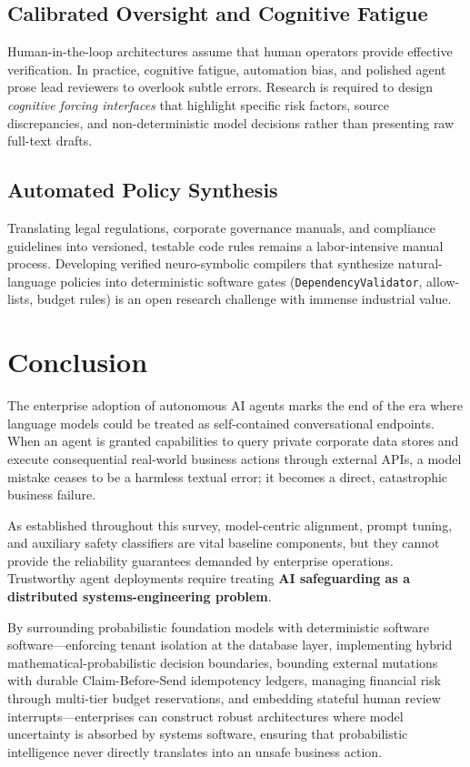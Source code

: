 \documentclass[10pt,a4paper,twocolumn]{article}
\begin{document}
\subsection{Calibrated Oversight and Cognitive Fatigue}
Human-in-the-loop architectures assume that human operators provide effective verification. In practice, cognitive fatigue, automation bias, and polished agent prose lead reviewers to overlook subtle errors. Research is required to design \emph{cognitive forcing interfaces} that highlight specific risk factors, source discrepancies, and non-deterministic model decisions rather than presenting raw full-text drafts.

\subsection{Automated Policy Synthesis}
Translating legal regulations, corporate governance manuals, and compliance guidelines into versioned, testable code rules remains a labor-intensive manual process. Developing verified neuro-symbolic compilers that synthesize natural-language policies into deterministic software gates (\texttt{DependencyValidator}, allow-lists, budget rules) is an open research challenge with immense industrial value.

\section{Conclusion}
\label{sec:conclusion}
The enterprise adoption of autonomous AI agents marks the end of the era where language models could be treated as self-contained conversational endpoints. When an agent is granted capabilities to query private corporate data stores and execute consequential real-world business actions through external APIs, a model mistake ceases to be a harmless textual error; it becomes a direct, catastrophic business failure.

As established throughout this survey, model-centric alignment, prompt tuning, and auxiliary safety classifiers are vital baseline components, but they cannot provide the reliability guarantees demanded by enterprise operations. Trustworthy agent deployments require treating \textbf{AI safeguarding as a distributed systems-engineering problem}. 

By surrounding probabilistic foundation models with deterministic software software---enforcing tenant isolation at the database layer, implementing hybrid mathematical-probabilistic decision boundaries, bounding external mutations with durable Claim-Before-Send idempotency ledgers, managing financial risk through multi-tier budget reservations, and embedding stateful human review interrupts---enterprises can construct robust architectures where model uncertainty is absorbed by systems software, ensuring that probabilistic intelligence never directly translates into an unsafe business action.
\end{document}
